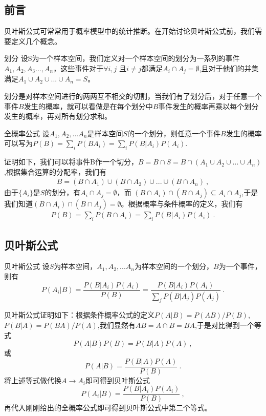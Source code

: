 
\subsection{前言}
贝叶斯公式可常常用于概率模型中的统计推断。在开始讨论贝叶斯公式前，我们需要定义几个概念。
\begin{definition}{划分}
设S为一个样本空间，我们定义对一个样本空间的划分为一系列的事件$A_1,A_2,A_3...,A_n$，这些事件对于$\forall i,j $ 且$i\neq j$都满足$A_i \cap A_j = \emptyset$,且对于他们的并集满足$A_1\cup A_2\cup ...\cup A_n = S$。
\end{definition}
划分是对样本空间进行的两两互不相交的切割，当我们有了划分后，对于任意一个事件$B$发生的概率，就可以看做是在每个划分中$B$事件发生的概率再乘以每个划分发生的概率，再对所有划分求和。
\begin{theorem}{全概率公式}
设$A_1,A_2,...A_n$是样本空间$S$的一个划分，则任意一个事件$B$发生的概率可以写为$P(B) = \sum_i P(B A_i)= \sum_i P(B| A_i) P(A_i).$
\end{theorem}
证明如下，我们可以将事件B作一个切分，$B = B \cap S = B \cap (A_1 \cup A_2 \cup ...\cup A_n)$,根据集合运算的分配率，我们有
\begin{align}
B = (B\cap A_1) \cup (B\cap A_2) \cup ... \cup (B \cap A_n)~,
\end{align}
由于$\{A_i\}$是$S$的划分，有$A_i \cap A_j = \emptyset$，而 $(B\cap A_i) \cap (B\cap A_j) \subseteq A_i \cap A_j$,于是我们知道$(B\cap A_i) \cap (B \cap A_j) = \emptyset$。根据概率与条件概率的定义，我们有
\begin{align}
P(B) = \sum_i P(B\cap A_i)  = \sum_i P(B | A_i) P(A_i)~.
\end{align}
\subsection{贝叶斯公式}
\begin{theorem}{贝叶斯公式}
设$S$为样本空间，$A_1,A_2,...A_n$为样本空间的一个划分，$B$为一个事件，则有
\begin{equation}
P(A_i|B) = \frac{P(B|A_i)P(A_i)}{P(B)} = \frac{P(B|A_i)P(A_i)}{\sum_j P(B|A_j)P(A_j)}~.
\end{equation}
\end{theorem}
贝叶斯公式证明如下：根据条件概率公式的定义$P(A|B) = P(AB)/P(B)$,$P(B|A) = P(BA)/P(A)$,我们显然有$AB = A\cap B = BA$,于是对比得到一个等式
\begin{equation}
P(A|B)P(B) = P(B|A)P(A)~,
\end{equation}
或
\begin{equation}
P(A|B) = \frac{P(B|A)P(A)}{P(B)}~.
\end{equation}
将上述等式做代换$A\rightarrow A_i$即可得到贝叶斯公式
\begin{equation}
P(A_i|B) = \frac{P(B|A_i)P(A_i)}{P(B)}~,
\end{equation}
再代入刚刚给出的全概率公式即可得到贝叶斯公式中第二个等式。
